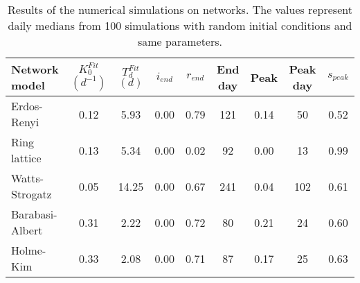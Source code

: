 \begin{table}[h]
\centering
\caption{Results of the numerical simulations on networks. The values represent daily medians from 100 simulations with random initial conditions and same parameters.}
\label{tab:results}
\begin{tabular}{lcccccccc}
\toprule
   Network model & $K_0^{Fit}$ $(d^{-1})$ & $T_d^{Fit}$ $(d)$ & $i_{end}$ & $r_{end}$ & End day & Peak  & Peak day & $s_{peak}$\\
\midrule
 Erdos-Renyi 			&    0.12 &   5.93 &  0.00 &  0.79 &    121 &  0.14 &   50 & 0.52 \\
 Ring lattice 		&    0.13 &   5.34 &  0.00 &  0.02 &  	 92 &  0.00 &   13 & 0.99 \\
 Watts-Strogatz 	&    0.05 &  14.25 &  0.00 &  0.67 &    241 &  0.04 &  102 & 0.61 \\
 Barabasi-Albert 	&    0.31 &   2.22 &  0.00 &  0.72 &  	 80 &  0.21 &   24 & 0.60 \\
 Holme-Kim 				&    0.33 &   2.08 &  0.00 &  0.71 &  	 87 &  0.17 &   25 & 0.63 \\

 
\bottomrule
\end{tabular}
\end{table}
